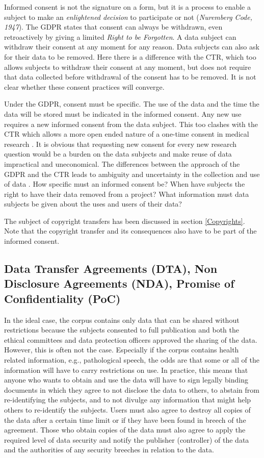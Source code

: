 \documentclass[10pt, a4paper]{article}
\begin{document}
Informed consent is not the signature on a form, but it is a process to enable a subject to make an {\em enlightened decision} to participate or not ({\em Nuremberg Code, 1947}). The GDPR states that consent can always be withdrawn, even retroactively by giving a limited {\em Right to be Forgotten}. A data subject can withdraw their consent at any moment for any reason. Data subjects can also ask for their data to be removed. Here there is a difference with the CTR, which too allows subjects to withdraw their consent at any moment, but does not require that data collected before withdrawal of the consent has to be removed. It is not clear whether these consent practices will converge. 

Under the GDPR, consent must be specific. The use of the data and the time the data will be stored must be indicated in the informed consent. Any new use requires a new informed consent from the data subject. This too clashes with the CTR which allows a more open ended nature of a one-time consent in medical research \cite{dittrich2015esmod}. It is obvious that requesting new consent for every new research question would be a burden on the data subjects and make reuse of data impractical and uneconomical. The differences between the approach of the GDPR and the CTR leads to ambiguity and uncertainty in the collection and use of data \cite{chassang2017impact}. How specific must an informed consent be? When have subjects the right to have their data removed from a project? What information must data subjects be given about the uses and users of their data?

The subject of copyright transfers has been discussed in section \ref{Copyrights}. Note that the copyright transfer and its consequences also have to be part of the informed consent. 

\subsection{Data Transfer Agreements (DTA), Non Disclosure Agreements (NDA), Promise of Confidentiality (PoC)}

In the ideal case, the corpus contains only data that can be shared without restrictions because the subjects consented to full publication and both the ethical committees and data protection officers approved the sharing of the data. However, this is often not the case. Especially if the corpus contains health related information, e.g., pathological speech, the odds are that some or all of the information will have to carry restrictions on use. In practice, this means that anyone who wants to obtain and use the data will have to sign legally binding documents in which they agree to not disclose the data to others, to abstain from re-identifying the subjects, and to not divulge any information that might help others to re-identify the subjects. Users must also agree to destroy all copies of the data after a certain time limit or if they have been found in breech of the agreement. Those who obtain copies of the data must also agree to apply the required level of data security and notify the publisher (controller) of the data and the authorities of any security breeches in relation to the data.
\end{document}
